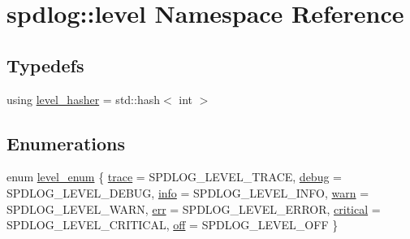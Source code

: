 \hypertarget{namespacespdlog_1_1level}{}\section{spdlog\+:\+:level Namespace Reference}
\label{namespacespdlog_1_1level}
\subsection*{Typedefs}
\begin{DoxyCompactItemize}
\item 
using \hyperlink{namespacespdlog_1_1level_add7f1cc7c1914c6f6a6773cfbd1bb997}{level\+\_\+hasher} = std\+::hash$<$ int $>$
\end{DoxyCompactItemize}
\subsection*{Enumerations}
\begin{DoxyCompactItemize}
\item 
enum \hyperlink{namespacespdlog_1_1level_a35f5227e5daf228d28a207b7b2aefc8b}{level\+\_\+enum} \{ \newline
\hyperlink{namespacespdlog_1_1level_a35f5227e5daf228d28a207b7b2aefc8badd5891a1416461ee9e7d7e19d41af51f}{trace} = S\+P\+D\+L\+O\+G\+\_\+\+L\+E\+V\+E\+L\+\_\+\+T\+R\+A\+CE, 
\hyperlink{namespacespdlog_1_1level_a35f5227e5daf228d28a207b7b2aefc8baea632f71a316dac4dbaf2d98534c7ca5}{debug} = S\+P\+D\+L\+O\+G\+\_\+\+L\+E\+V\+E\+L\+\_\+\+D\+E\+B\+UG, 
\hyperlink{namespacespdlog_1_1level_a35f5227e5daf228d28a207b7b2aefc8ba7f09db55ad64d87e4124f10582cb016f}{info} = S\+P\+D\+L\+O\+G\+\_\+\+L\+E\+V\+E\+L\+\_\+\+I\+N\+FO, 
\hyperlink{namespacespdlog_1_1level_a35f5227e5daf228d28a207b7b2aefc8ba6c371ca09668dd308a1997eab47def05}{warn} = S\+P\+D\+L\+O\+G\+\_\+\+L\+E\+V\+E\+L\+\_\+\+W\+A\+RN, 
\newline
\hyperlink{namespacespdlog_1_1level_a35f5227e5daf228d28a207b7b2aefc8ba4d723e295b98a75c1263d85fc165045f}{err} = S\+P\+D\+L\+O\+G\+\_\+\+L\+E\+V\+E\+L\+\_\+\+E\+R\+R\+OR, 
\hyperlink{namespacespdlog_1_1level_a35f5227e5daf228d28a207b7b2aefc8ba309b214a2b8629b6cf0048ce916e8a58}{critical} = S\+P\+D\+L\+O\+G\+\_\+\+L\+E\+V\+E\+L\+\_\+\+C\+R\+I\+T\+I\+C\+AL, 
\hyperlink{namespacespdlog_1_1level_a35f5227e5daf228d28a207b7b2aefc8ba917591d8c0e89f6e6247c95c67809a1a}{off} = S\+P\+D\+L\+O\+G\+\_\+\+L\+E\+V\+E\+L\+\_\+\+O\+FF
 \}
\end{DoxyCompactItemize}
